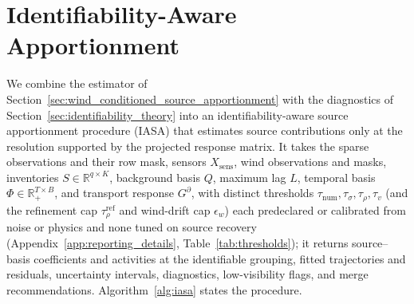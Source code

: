 \section{Identifiability-Aware Apportionment}
\label{sec:identifiability_aware_method}

We combine the estimator of
Section~\ref{sec:wind_conditioned_source_apportionment} with the diagnostics of
Section~\ref{sec:identifiability_theory} into an identifiability-aware source
apportionment procedure (IASA) that estimates source contributions only at the
resolution supported by the projected response matrix.  It takes the sparse
observations and their row mask, sensors \(X_{\mathrm{sens}}\), wind observations
and masks, inventories \(S\in\mathbb R^{q\times K}\), background basis \(Q\),
maximum lag \(L\), temporal basis \(\Phi\in\mathbb R_+^{T\times B}\), and transport
response \(G^\partial\), with distinct thresholds
\(\tau_{\mathrm{num}},\tau_\sigma,\tau_\rho,\tau_v\) (and the refinement cap
\(\tau_\rho^{\mathrm{ref}}\) and wind-drift cap \(\epsilon_w\)) each predeclared or
calibrated from noise or physics and none tuned on source recovery
(Appendix~\ref{app:reporting_details}, Table~\ref{tab:thresholds}); it returns
source--basis coefficients and activities at the identifiable grouping, fitted
trajectories and residuals, uncertainty intervals, diagnostics, low-visibility
flags, and merge recommendations.  Algorithm~\ref{alg:iasa} states the procedure.

